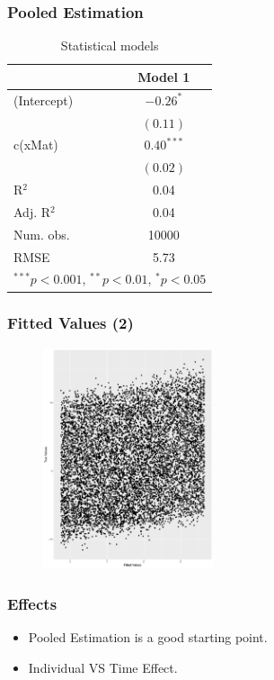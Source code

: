 \documentclass{beamer}
\newcommand{\1}{\mathbb{1}}
\begin{document}
\begin{frame}\frametitle{Pooled Estimation}
\begin{table}
\begin{center}
\begin{tabular}{l c }
\hline
 & Model 1 \\
\hline
(Intercept) & $-0.26^{*}$  \\
            & $(0.11)$     \\
c(xMat)     & $0.40^{***}$ \\
            & $(0.02)$     \\
\hline
R$^2$       & 0.04         \\
Adj. R$^2$  & 0.04         \\
Num. obs.   & 10000        \\
RMSE        & 5.73         \\
\hline
\multicolumn{2}{l}{\scriptsize{$^{***}p<0.001$, $^{**}p<0.01$, $^*p<0.05$}}
\end{tabular}
\caption{Statistical models}
\label{table:coefficients}
\end{center}
\end{table}
\end{frame}


\begin{frame}\frametitle{Fitted Values (2)}
\begin{figure}
\includegraphics[width = 5cm]{plot/reg2}
\end{figure}
\end{frame}

\begin{frame}\frametitle{Effects}
\begin{itemize}
 \item Pooled Estimation is a good starting point.
 \item Individual VS Time Effect.
\end{itemize}
\end{frame}
\end{document}
